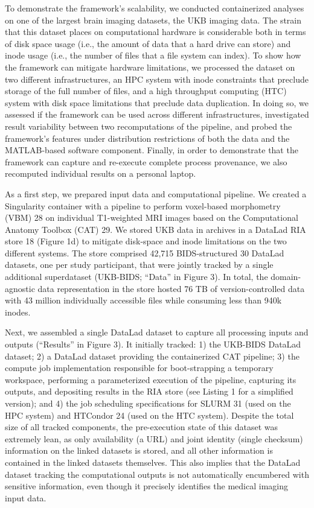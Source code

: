 To demonstrate the framework’s scalability, we conducted containerized analyses on one of the largest brain imaging datasets, the UKB imaging data. The strain that this dataset places on computational hardware is considerable both in terms of disk space usage (i.e., the amount of data that a hard drive can store) and inode usage (i.e., the number of files that a file system can index). To show how the framework can mitigate hardware limitations, we processed the dataset on two different infrastructures, an HPC system with inode constraints that preclude storage of the full number of files, and a high throughput computing (HTC) system with disk space limitations that preclude data duplication. In doing so, we assessed if the framework can be used across different infrastructures, investigated result variability between two recomputations of the pipeline, and probed the framework’s features under distribution restrictions of both the data and the MATLAB-based software component. Finally, in order to demonstrate that the framework can capture and re-execute complete process provenance, we also recomputed individual results on a personal laptop.

As a first step, we prepared input data and computational pipeline. We created a Singularity container with a pipeline to perform voxel-based morphometry (VBM) 28 on individual T1-weighted MRI images based on the Computational Anatomy Toolbox (CAT) 29. We stored UKB data in archives in a DataLad RIA store 18 (Figure 1d) to mitigate disk-space and inode limitations on the two different systems. The store comprised 42,715 BIDS-structured 30 DataLad datasets, one per study participant, that were jointly tracked by a single additional superdataset (UKB-BIDS; “Data” in Figure 3). In total, the domain-agnostic data representation in the store hosted 76 TB of version-controlled data with 43 million individually accessible files while consuming less than 940k inodes.

Next, we assembled a single DataLad dataset to capture all processing inputs and outputs (“Results” in Figure 3). It initially tracked: 1) the UKB-BIDS DataLad dataset; 2) a DataLad dataset providing the containerized CAT pipeline; 3) the compute job implementation responsible for boot-strapping a temporary workspace, performing a parameterized execution of the pipeline, capturing its outputs, and depositing results in the RIA store (see Listing 1 for a simplified version); and 4) the job scheduling specifications for SLURM 31 (used on the HPC system) and HTCondor 24 (used on the HTC system). Despite the total size of all tracked components, the pre-execution state of this dataset was extremely lean, as only availability (a URL) and joint identity (single checksum) information on the linked datasets is stored, and all other information is contained in the linked datasets themselves. This also implies that the DataLad dataset tracking the computational outputs is not automatically encumbered with sensitive information, even though it precisely identifies the medical imaging input data.


